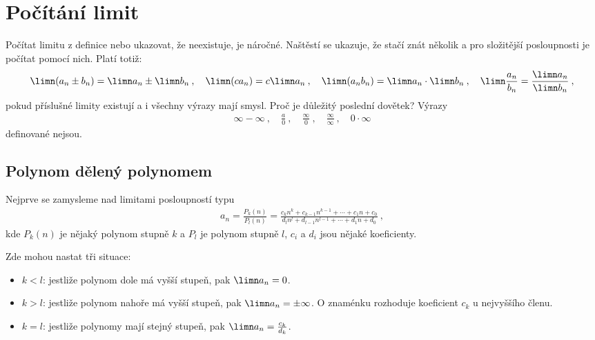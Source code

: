 \section*{Počítání limit}

Počítat limitu z definice nebo ukazovat, že neexistuje, je náročné. Naštěstí se ukazuje, že stačí znát několik  a pro složitější posloupnosti je počítat pomocí nich. Platí totiž:
\begin{align}
    \limn (a_n \pm b_n) = \limn a_n \pm \limn b_n \:, \quad
    \limn (ca_n) = c \limn a_n \:, \quad
    \limn (a_n b_n) = \limn a_n \cdot \limn b_n \:, \quad
    \limn \frac{a_n}{b_n} = \frac{\limn a_n}{\limn b_n} \:,
\end{align}
pokud příslušné limity existují a i všechny výrazy mají smysl. Proč je důležitý poslední dovětek? Výrazy 
\begin{align}
    \infty - \infty \:,\quad 
    \frac{a}{0} \:,\quad 
    \frac{\infty}{0} \:,\quad 
    \frac{\infty}{\infty} \:,\quad
    0 \cdot \infty
\end{align}
definované nejsou.


\subsection*{Polynom dělený polynomem}

Nejprve se zamysleme nad limitami posloupností typu
\begin{align}
    a_n = \frac{P_k(n)}{P_l(n)} = 
    \frac{c_k n^k + c_{k-1} n^{k-1} + \cdots + c_1 n + c_0}
    {d_l n^l + d_{l-1} n^{l-1} + \cdots + d_1 n + d_0}\:,
\end{align}
kde $P_k(n)$ je nějaký polynom stupně $k$ a $P_l$ je polynom stupně $l$, $c_i$ a $d_i$ jsou nějaké koeficienty.

Zde mohou nastat tři situace:
\begin{itemize}
    \item $k<l$: jestliže polynom dole má vyšší stupeň, pak $\limn a_n = 0$.
    \item $k>l$: jestliže polynom nahoře má vyšší stupeň, pak $\limn a_n = \pm \infty$. O znaménku rozhoduje koeficient $c_k$ u nejvyššího členu.
    \item $k=l$: jestliže polynomy mají stejný stupeň, pak $\limn a_n = \frac{c_k}{d_k}$.
\end{itemize}

